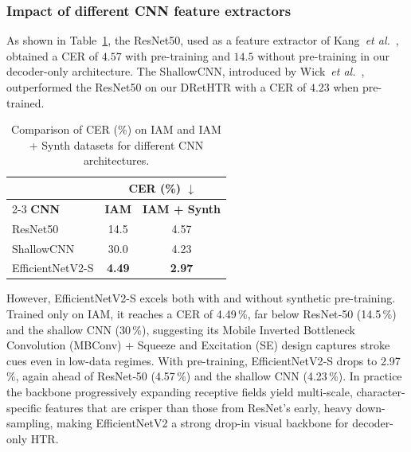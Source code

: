 \documentclass[times, review, 10pt]{elsarticle}
\begin{document}
\subsubsection{Impact of different CNN feature extractors}
As shown in Table~\ref{tab:cnn_cer_comparison}, the ResNet50, used as a feature extractor of Kang~\textit{et al.}~\cite{Kang}, obtained a CER of $4.57$ with pre-training and $14.5$ without pre-training in our decoder-only architecture. The ShallowCNN, introduced by Wick~\textit{et al.}~\cite{Wick}, outperformed the ResNet50 on our DRetHTR with a CER of $4.23$ when pre-trained. 
\begin{table}[t]
\centering
\caption{Comparison of CER (\%) on IAM and IAM + Synth datasets for different CNN architectures.}
{\small
\begin{tabular}{lcc}  
\toprule
 & \multicolumn{2}{c}{\textbf{CER (\%)} $\downarrow$} \\
\cmidrule(lr){2-3}
\textbf{CNN} & \textbf{IAM} & \textbf{IAM + Synth} \\
\midrule
ResNet50 & 14.5 & 4.57 \\
ShallowCNN & 30.0 & 4.23 \\
EfficientNetV2-S & \textbf{4.49} & \textbf{2.97} \\
\bottomrule
\end{tabular}
\label{tab:cnn_cer_comparison}
}
\end{table}
However, EfficientNetV2-S excels both with and without synthetic pre-training. Trained only on IAM, it reaches a CER of 4.49\,\%, far below ResNet‑50 (14.5\,\%) and the shallow CNN (30\,\%), suggesting its Mobile Inverted Bottleneck Convolution (MBConv) + Squeeze and Excitation (SE) \cite{Tan2021EfficientNetV2SM} design captures stroke cues even in low-data regimes. With pre-training, EfficientNetV2‑S drops to 2.97\,\%, again ahead of ResNet‑50 (4.57\,\%) and the shallow CNN (4.23\,\%). In practice the backbone progressively expanding receptive fields yield multi-scale, character-specific features that are crisper than those from ResNet’s early, heavy down-sampling, making EfficientNetV2 a strong drop-in visual backbone for decoder-only HTR.
\end{document}
